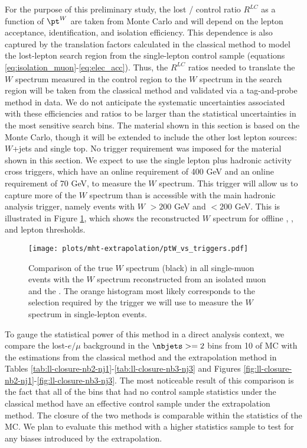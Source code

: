 For the purpose of this preliminary study, the lost / control ratio $R^{LC}$
as a function of $\pt^W$ are taken from Monte Carlo and will depend on the lepton acceptance,
identification, and isolation efficiency.  This dependence is also captured by the translation factors calculated in the classical method to model the lost-lepton search region from the single-lepton control sample (equations \ref{eq:isolation_muon}-\ref{eq:elec_acc}).
Thus, the $R^{LC}$ ratios needed to translate the $W$ \pt spectrum measured in the control region to the $W$ \pt spectrum in the search region will be taken from the classical method and validated via a tag-and-probe method in data.
We do not anticipate the systematic uncertainties associated with these efficiencies and ratios to be larger than the statistical uncertainties
in the most sensitive search bins.
The material shown in this section is based on the \ttbar Monte Carlo, though it will be
extended to include the other lost lepton sources: $W$+jets and single top.
No trigger requirement was imposed for the material shown in this section.  We expect to
use the single lepton plus hadronic activity cross triggers, which have an online \HT requirement of 400 GeV and an online \MET requirement of 70 GeV, to measure the $W$ \pt spectrum.  This trigger will allow us to capture more of the $W$ \pt spectrum than is accessible with the main hadronic analysis trigger, namely events with $W$ \pt $>200$ GeV and \MHT $<200$ GeV.  This is illustrated in Figure \ref{fig:ptW-vs-triggers}, which shows the reconstructed $W$ \pt spectrum for offline \MHT, \HT, and lepton \pt thresholds.

\begin{figure}
\texttt{[image: plots/mht-extrapolation/ptW\_vs\_triggers.pdf]}
  \caption{
    Comparison of the true $W$ \pt spectrum (black) in all single-muon \ttbar events with the $W$ \pt spectrum reconstructed from an isolated muon and the \MHT.  The orange histogram most likely corresponds to the selection required by the trigger we will use to measure the $W$ \pt spectrum in single-lepton events.
  }
  \label{fig:ptW-vs-triggers}
\end{figure}

To gauge the statistical power of this method in a direct analysis context, we compare the lost-$e/\mu$ background in the $\nbjets>=2$ bins from 10 \invfb of \ttbar MC with the estimations from the classical method and the extrapolation method in Tables \ref{tab:ll-closure-nb2-nj1}-\ref{tab:ll-closure-nb3-nj3} and Figures \ref{fig:ll-closure-nb2-nj1}-\ref{fig:ll-closure-nb3-nj3}. The most noticeable result of this comparison is the fact that all of the bins that had no control sample statistics under the classical method have an effective control sample under the extrapolation method.  The closure of the two methods is comparable within the statistics of the MC.  We plan to evaluate this method with a higher statistics sample to test for any biases introduced by the extrapolation.
\clearpage

